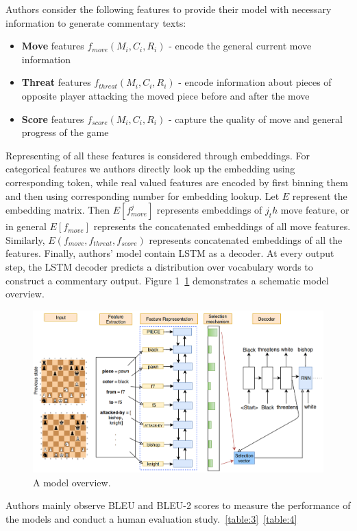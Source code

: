 \documentclass{article}
\begin{document}
Authors consider the following features to provide their model with necessary information to generate commentary texts:

\begin{itemize}
\item \textbf{Move} features $f_{move}(M_i, C_i, R_i)$ - encode the general current move information
\item \textbf{Threat} features $f_{threat}(M_i, C_i, R_i)$ - encode information about pieces of opposite player attacking the moved piece before and after the move
\item \textbf{Score} features $f_{score}(M_i, C_i, R_i)$ - capture the quality of move and general progress of the game
\end{itemize}

Representing of all these features is considered through embeddings. For categorical features we authors directly look up the embedding using corresponding token, while real valued features are encoded by first binning them and then using corresponding number for embedding lookup. Let $E$ represent the embedding matrix. Then $E[f^j_{move}]$ represents embeddings of $j_th$ move feature, or in general $E[f_{move}]$ represents the concatenated embeddings of all move features. Similarly, $E(f_{move}, f_{threat}, f_{score})$ represents concatenated embeddings of all the features.
Finally, authors' model contain LSTM as a decoder. At every output step, the LSTM decoder predicts a distribution over vocabulary words to construct a commentary output. Figure 1~\ref{fig:1} demonstrates a schematic model overview.

\begin{figure}
    \centering
    \includegraphics[width = 12cm]{fig_1.png}
    \caption{A model overview.}
    \label{fig:1}
    \end{figure}

Authors mainly observe BLEU and BLEU-2 scores to measure the performance of the models and conduct a human evaluation study.~\ref{table:3}~\ref{table:4}
\end{document}
